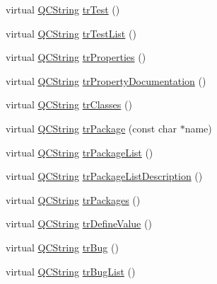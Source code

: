 \begin{DoxyCompactItemize}
\item 
virtual \mbox{\hyperlink{class_q_c_string}{Q\+C\+String}} \mbox{\hyperlink{class_translator_chinesetraditional_a986fde8083b58bef975adf8b94e40718}{tr\+Test}} ()
\item 
virtual \mbox{\hyperlink{class_q_c_string}{Q\+C\+String}} \mbox{\hyperlink{class_translator_chinesetraditional_a08c527aab589d7798710e841c0d79294}{tr\+Test\+List}} ()
\item 
virtual \mbox{\hyperlink{class_q_c_string}{Q\+C\+String}} \mbox{\hyperlink{class_translator_chinesetraditional_a12d4ce73f80d761d88d4f48502d1deb4}{tr\+Properties}} ()
\item 
virtual \mbox{\hyperlink{class_q_c_string}{Q\+C\+String}} \mbox{\hyperlink{class_translator_chinesetraditional_a957f249ec35e3e55307591caed7094a6}{tr\+Property\+Documentation}} ()
\item 
virtual \mbox{\hyperlink{class_q_c_string}{Q\+C\+String}} \mbox{\hyperlink{class_translator_chinesetraditional_a595c8dfa4f0a38cae32a616baae240f1}{tr\+Classes}} ()
\item 
virtual \mbox{\hyperlink{class_q_c_string}{Q\+C\+String}} \mbox{\hyperlink{class_translator_chinesetraditional_af245c5b503a9b765a2d2eb7ef2d793c1}{tr\+Package}} (const char $\ast$name)
\item 
virtual \mbox{\hyperlink{class_q_c_string}{Q\+C\+String}} \mbox{\hyperlink{class_translator_chinesetraditional_a0f012231cca065aadb4c58ed4615a1a3}{tr\+Package\+List}} ()
\item 
virtual \mbox{\hyperlink{class_q_c_string}{Q\+C\+String}} \mbox{\hyperlink{class_translator_chinesetraditional_ab4f562c3bfac8511ccd149ca98ef9415}{tr\+Package\+List\+Description}} ()
\item 
virtual \mbox{\hyperlink{class_q_c_string}{Q\+C\+String}} \mbox{\hyperlink{class_translator_chinesetraditional_ae1689433305f64baaa07a2995bad1216}{tr\+Packages}} ()
\item 
virtual \mbox{\hyperlink{class_q_c_string}{Q\+C\+String}} \mbox{\hyperlink{class_translator_chinesetraditional_a28a2c7f00f59d94cb514868bce7e02a1}{tr\+Define\+Value}} ()
\item 
virtual \mbox{\hyperlink{class_q_c_string}{Q\+C\+String}} \mbox{\hyperlink{class_translator_chinesetraditional_a5f09c2d99e71b0ecd441790b30c7f8fa}{tr\+Bug}} ()
\item 
virtual \mbox{\hyperlink{class_q_c_string}{Q\+C\+String}} \mbox{\hyperlink{class_translator_chinesetraditional_a25ced0a35ed54142173ffc5eec867b8d}{tr\+Bug\+List}} ()
\item 

\end{DoxyCompactItemize}
